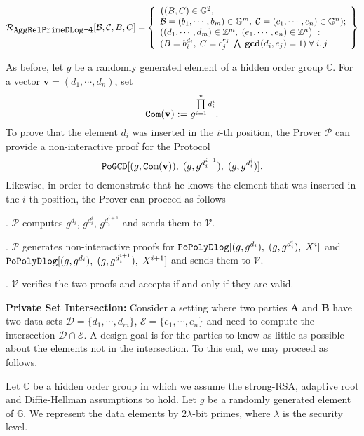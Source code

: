 \documentclass[11pt, lettersize, notitlepage, leqno, footskip=0.6cm]{article}
\newcommand{\bz}{\mathbb Z}
\newcommand{\pl}{\prod\limits}
\newcommand{\mc}{\mathcal}
\newcommand{\mb}{\mathbb}
\newcommand{\mbf}{\mathbf}
\newcommand{\lam}{\lambda}
\newcommand{\mP}{\mc{P}}
\newcommand{\V}{\mc{V}}
\newcommand{\vs}{\vspace{-0.15cm}}
\newcommand{\noin}{\noindent}
\newcommand{\GCD}{\mbf{gcd}}
\numberwithin{equation}{section}
\begin{document}
{\[
  \mc{R}_{{\protect\verb|AggRelPrimeDLog-4|}}[\mc{B}, \mc{C}, B, C] = \left\{\begin{array}{l}
    \big((B,C)\in\mb{G}^2,\;\\
     \mc{B} = (b_1,\cdots,b_m)\in\mb{G}^m,\;\mc{C} = (c_1,\cdots, c_n)\in\mb{G}^n);\\
    ((d_1,\cdots,d_m)\in\bz^m,\; (e_1,\cdots,e_n)\in\bz^n\big)\;: \\
    (B = b_i^{d_i},\; C = c_j^{e_j}\;\bigwedge \; \GCD(d_i, e_j) = 1)\;\forall \;i,j
  \end{array}\right\}
\] 


\bigskip

\newpage

As before, let $g$ be a randomly generated element of a hidden order group $\mb{G}$. For a vector $\mbf{v} = (d_1,\cdots, d_n)$, set \vs $$\protect{\verb|Com|}(\mbf{v}):= g^{\pl_{i=1}^n d_i^{i}}.$$ To prove that the element $d_i$ was inserted in the $i$-th position, the Prover $\mP$ can provide a non-interactive proof for the Protocol \vs $$\protect{\verb|PoGCD|}[(g,\protect{\verb|Com|}(\mbf{v})),\;(g, g^{d_i^{i+1}}),\;(g, g^{d_i^{i}})].$$ Likewise, in order to demonstrate that he knows the element that was inserted in the $i$-th position, the Prover can proceed as follows

\noin 1. $\mP$ computes $g^{d_i}$, $g^{d_i^{i}}$, $g^{d_i^{i+1}}$ and sends them to $\V$.

\noin 2. $\mP$ generates non-interactive proofs for $\protect{\verb|PoPolyDlog|}[(g,g^{d_i}),\;(g,g^{d_i^i}),\;X^i]$ and\\ $\protect{\verb|PoPolyDlog|}[(g,g^{d_i}),\;(g,g^{d_i^{i+1}}),\;X^{i+1}]$ and sends them to $\V$.

\noin 3. $\V$ verifies the two proofs and accepts if and only if they are valid. 


\bigskip

\noin \textbf{Private Set Intersection:} Consider a setting where two parties $\mbf{A}$ and $\mbf{B}$ have two data sets $\mc{D} = \{d_1,\cdots,d_m \}$, $\mc{E} = \{e_1,\cdots,e_n \}$ and need to compute the intersection $\mc{D}\cap \mc{E}$. A design goal is for the parties to know as little as possible about the elements not in the intersection. To this end, we may proceed as follows. 

Let $\mb{G}$ be a hidden order group in which we assume the strong-RSA, adaptive root and Diffie-Hellman assumptions to hold. Let $g$ be a randomly generated element of $\mb{G}$. We represent the data elements by $2\lam$-bit primes, where $\lam$ is the security level. \vspace{0.15cm}

}
\end{document}
